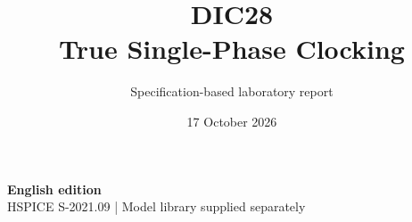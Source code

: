 \documentclass[11pt,a4paper]{article}
\title{\color{accent}DIC28\\[4pt]True Single-Phase Clocking}
\author{Specification-based laboratory report}
\date{17 October 2026}
\begin{document}
\maketitle
\begin{center}\small\textbf{English edition}\\
HSPICE S-2021.09 \quad | \quad Model library supplied separately
\end{center}


\end{document}
